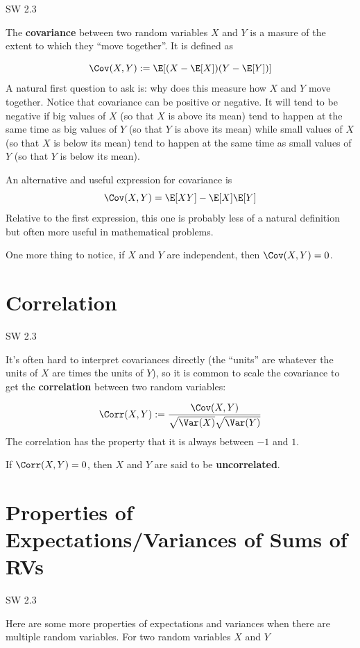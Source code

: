 \documentclass[
  letterpaper,
  DIV=11,
  numbers=noendperiod]{scrreprt}
\begin{document}
SW 2.3

The \textbf{covariance} between two random variables \(X\) and \(Y\) is
a masure of the extent to which they ``move together''. It is defined as

\[
  \Cov(X,Y) := \E[(X-\E[X])(Y-\E[Y])]
\] A natural first question to ask is: why does this measure how \(X\)
and \(Y\) move together. Notice that covariance can be positive or
negative. It will tend to be negative if big values of \(X\) (so that
\(X\) is above its mean) tend to happen at the same time as big values
of \(Y\) (so that \(Y\) is above its mean) while small values of \(X\)
(so that \(X\) is below its mean) tend to happen at the same time as
small values of \(Y\) (so that \(Y\) is below its mean).

An alternative and useful expression for covariance is \[
  \Cov(X,Y) = \E[XY] - \E[X]\E[Y]
\] Relative to the first expression, this one is probably less of a
natural definition but often more useful in mathematical problems.

One more thing to notice, if \(X\) and \(Y\) are independent, then
\(\Cov(X,Y) = 0\).

\section{Correlation}\label{correlation}

SW 2.3

It's often hard to interpret covariances directly (the ``units'' are
whatever the units of \(X\) are times the units of \(Y\)), so it is
common to scale the covariance to get the \textbf{correlation} between
two random variables:

\[
  \Corr(X,Y) := \frac{\Cov(X,Y)}{\sqrt{\Var(X)} \sqrt{\Var(Y)}}
\] The correlation has the property that it is always between \(-1\) and
\(1\).

If \(\Corr(X,Y) = 0\), then \(X\) and \(Y\) are said to be
\textbf{uncorrelated}.

\section{Properties of Expectations/Variances of Sums of
RVs}\label{properties-of-expectationsvariances-of-sums-of-rvs}

SW 2.3

Here are some more properties of expectations and variances when there
are multiple random variables. For two random variables \(X\) and \(Y\)
\end{document}
